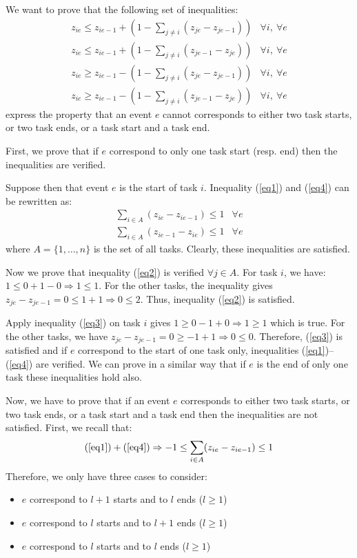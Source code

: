 \documentclass{report}
\begin{document}
We want to prove that the following set of inequalities: 
\begin{align}
z_{ie} \le z_{ie-1}+(1-\sum_{j\neq i}(z_{je}-z_{je-1})) & \forall
i,\ \forall e \label{eq1}\\
z_{ie} \le z_{ie-1}+(1-\sum_{j\neq i}(z_{je-1}-z_{je})) & \forall
i,\ \forall e\label{eq2}\\
z_{ie} \ge z_{ie-1}-(1-\sum_{j\neq i}(z_{je}-z_{je-1})) & \forall
i,\ \forall e\label{eq3}\\
z_{ie} \ge z_{ie-1}-(1-\sum_{j\neq i}(z_{je-1}-z_{je})) & \forall
i,\ \forall e\label{eq4}
\end{align}
express the property that an event $e$ cannot corresponds to either
two task starts, or two task ends, or a task start and a task end.

First, we prove that if $e$ correspond to only one task start
(resp. end) then the inequalities are verified.

Suppose then that event $e$ is the start of task $i$. Inequality
(\ref{eq1}) and (\ref{eq4}) can be rewritten as:
\begin{align}
\sum_{i\in A}(z_{ie}-z_{ie-1}) \le 1 &\forall e\label{eq5}\\
\sum_{i\in A}(z_{ie-1}-z_{ie}) \le 1 &\forall e\label{eq6}
\end{align}
where $A=\{1,\dots,n\}$ is the set of all tasks. Clearly, these
inequalities are satisfied.

Now we prove that inequality (\ref{eq2}) is verified $\forall j\in
A$. For task $i$, we have: $1 \le 0+1-0 \Rightarrow 1 \le 1$. For the
other tasks, the inequality gives $z_{je}-z_{je-1}=0 \le 1+1
\Rightarrow 0\le 2$. Thus, inequality (\ref{eq2}) is satisfied.

Apply inequality (\ref{eq3}) on task $i$ gives $1 \ge 0 - 1 +0
\Rightarrow 1 \ge 1$ which is true. For the other tasks, we have
$z_{je}-z_{je-1}=0 \ge -1+1 \Rightarrow 0\le 0$. Therefore,
(\ref{eq3}) is satisfied and if $e$ correspond to the start of one
task only, inequalities (\ref{eq1})--(\ref{eq4}) are verified. We can
prove in a similar way that if $e$ is the end of only one task these
inequalities hold also.

Now, we have to prove that if an event $e$ corresponds to either two
task starts, or two task ends, or a task start and a task end then the
inequalities are not satisfied. First, we recall that:
\[(\ref{eq1})+(\ref{eq4}) \Rightarrow -1 \le \sum_{i\in A}(z_{ie}-z_{ie-1}) \le 1\]
Therefore, we only have three cases to consider: 
\begin{itemize}
\item $e$ correspond to $l+1$ starts and to $l$ ends ($l\ge 1$)
\item $e$ correspond to $l$ starts and to $l+1$ ends ($l\ge 1$)
\item $e$ correspond to $l$ starts and to $l$ ends ($l\ge 1$)
\end{itemize}
\end{document}
